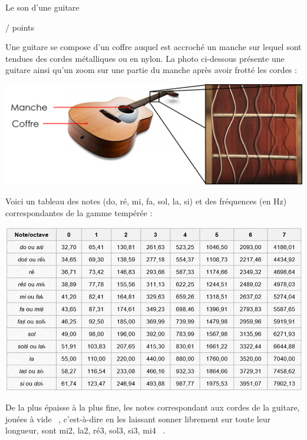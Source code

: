\begin{doc}{Le son d’une guitare
 \begin{Large}
    / points
\end{Large}}
Une guitare se compose d'un coffre auquel est accroché un manche sur lequel sont tendues des cordes métalliques ou en nylon. La photo ci-dessous présente une guitare ainsi qu'un zoom sur une partie du manche après avoir frotté les cordes :

\begin{center}
    \includegraphics[scale=0.5]{Images/DS/Devoir_Commun/Guitare.png}
\end{center}

Voici un tableau des notes (do, ré, mi, fa, sol, la, si) et des fréquences (en Hz) correspondantes de la gamme tempérée :
\begin{center}
    \includegraphics[scale=0.7]{Images/DS/Devoir_Commun/Notes_guitare.png}
\end{center}
De la plus épaisse à la plus fine, les notes correspondant aux cordes de la guitare, jouées \og à vide \fg~, c’est-à-dire en les laissant sonner librement sur toute leur longueur, sont  \og mi2, la2, ré3, sol3, si3, mi4 \fg~.


\end{doc}
